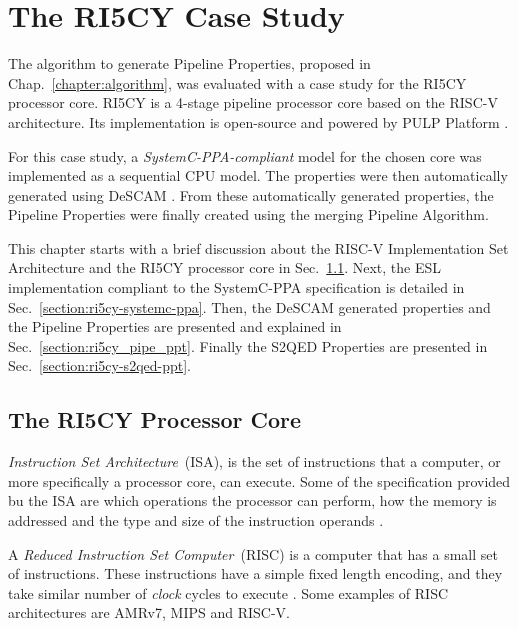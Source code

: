 \chapter{The RI5CY Case Study}

The algorithm to generate Pipeline Properties, proposed in Chap.~\ref{chapter:algorithm},  was evaluated with a case study for the RI5CY processor core. RI5CY is a 4-stage pipeline processor core based on the RISC-V architecture. Its implementation is open-source and powered by PULP Platform \cite{pulp}.

For this case study, a \textit{SystemC-PPA-compliant} \cite{paper-pdd} model for the chosen core was implemented as a sequential CPU model. The properties were then automatically generated using DeSCAM \cite{descam}. From these automatically generated properties, the Pipeline Properties were finally created using the merging Pipeline Algorithm. 

This chapter starts with a brief discussion about the RISC-V Implementation Set Architecture and the RI5CY processor core in Sec.~\ref{section:ri5cy_core}. Next, the ESL implementation compliant to the SystemC-PPA specification is detailed in Sec.~\ref{section:ri5cy-systemc-ppa}. Then, the DeSCAM generated properties and the Pipeline Properties are presented and explained in Sec.~\ref{section:ri5cy_pipe_ppt}. Finally the S2QED Properties are presented in Sec.~\ref{section:ri5cy-s2qed-ppt}.

\section{The RI5CY Processor Core}
\label{section:ri5cy_core}

\textit{Instruction Set Architecture}~(ISA), is the set of instructions that a computer, or more specifically a processor core, can execute. Some of the specification provided bu the ISA are which operations the processor can perform, how the memory is addressed and the type and size of the instruction operands \cite{book-comp-arch}.

A \textit{Reduced Instruction Set Computer}~(RISC) is a computer that has a small set of instructions. These instructions have a simple fixed length encoding, and they take similar number of \textit{clock} cycles to execute \cite{book-comp-arch}. Some examples of RISC architectures are AMRv7, MIPS and RISC-V.

